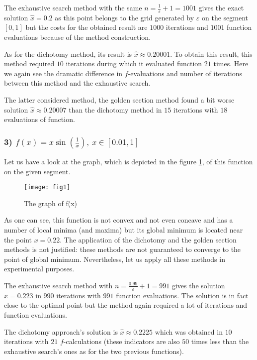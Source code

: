 \documentclass[12pt, bachelor, substylefile = algo_title.rtx]{disser}
\newcommand{\eps}{\varepsilon}
\theoremstyle{definition}
\begin{document}
The exhaustive search method with the same $n = \frac{1}{\eps} + 1 = 1001$ gives the exact solution $\widehat{x} = 0.2$ as this point belongs to the grid generated by $\eps$ on the segment $[0, 1]$ but the costs for the obtained result are $1000$ iterations and $1001$ function evaluations because of the method construction.

As for the dichotomy method, its result is $\widehat{x} \approx 0.20001$. To obtain this result, this method required $10$ iterations during which it evaluated function $21$ times. Here we again see the dramatic difference in $f$-evaluations and number of iterations between this method and the exhaustive search.

The latter considered method, the golden section method found a bit worse solution $\widehat{x} \approx 0.20007$ than the dichotomy method in $15$ iterations with $18$ evaluations of function.

\subsubsection{3) $f(x) = x\sin\left(\frac{1}{x}\right),\ x \in [0.01, 1]$}
Let us have a look at the graph, which is depicted in the figure \ref{fig: 1}, of this function on the given segment.

\begin{figure}[h]
\begin{center}
\texttt{[image: fig1]}
\caption{The graph of f(x)}
\label{fig: 1}
\end{center}
\end{figure}

As one can see, this function is not convex and not even concave and has a number of local minima (and maxima) but its global minimum is located near the point $x = 0.22$. The application of the dichotomy and the golden section methods is not justified: these methods are not guaranteed to converge to the point of global minimum. Nevertheless, let us apply all these methods in experimental purposes.

The exhaustive search method with $n = \frac{0.99}{\eps} + 1 = 991$ gives the solution $\widehat{x} = 0.223$ in $990$ iterations with $991$ function evaluations. The solution is in fact close to the optimal point but the method again required a lot of iterations and function evaluations.

The dichotomy approach's solution is $\widehat{x} \approx 0.2225$ which was obtained in $10$ iterations with $21$ $f$-calculations (these indicators are also $50$ times less than the exhaustive search's ones as for the two previous functions).
\end{document}
